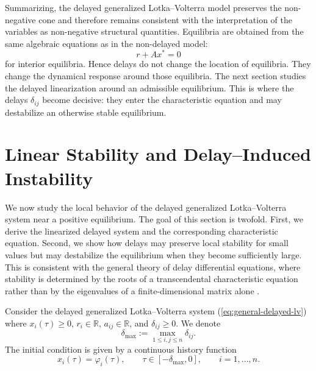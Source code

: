 \documentclass[11pt]{article}
\def\eq#1{(\ref{#1})}
\begin{document}

Summarizing, the delayed generalized Lotka--Volterra model preserves the non-negative cone
and therefore remains consistent with the interpretation of the variables as
non-negative structural quantities. Equilibria are obtained from the same
algebraic equations as in the non-delayed model:
\[
r+Ax^\ast=0
\]
for interior equilibria. Hence delays do not change the location of equilibria.
They change the dynamical response around those equilibria.
The next section studies the delayed linearization around an admissible
equilibrium. This is where the delays \(\delta_{ij}\) become decisive: they enter
the characteristic equation and may destabilize an otherwise stable equilibrium.



 \section{Linear Stability and Delay--Induced Instability}

 \label{sec:linearization-local-stability}
 
 We now study the local behavior of the delayed generalized Lotka--Volterra
 system near a positive equilibrium. The goal of this section is twofold. First,
 we derive the linearized delayed system and the corresponding characteristic
 equation. Second, we show how delays may preserve local stability for small
 values but may destabilize the equilibrium when they become sufficiently large.
 This is consistent with the general theory of delay differential equations,
 where stability is determined by the roots of a transcendental characteristic
 equation rather than by the eigenvalues of a finite-dimensional matrix alone
 \cite{hale1993introduction,fukuda2022stability}.
 
 Consider the delayed generalized Lotka--Volterra system
 \eq{eq:general-delayed-lv}
 where $x_i(\tau)\geq 0$, $r_i\in\mathbb{R}$, $a_{ij}\in\mathbb{R}$, and
 $\delta_{ij}\geq 0$. We denote
 \[
 \delta_{\max}:=\max_{1\leq i,j\leq n}\delta_{ij}.
 \]
 The initial condition is given by a continuous history function
 \[
 x_i(\tau)=\varphi_i(\tau),
 \qquad
 \tau\in[-\delta_{\max},0],
 \qquad
 i=1,\ldots,n.
 \]
 
\end{document}
